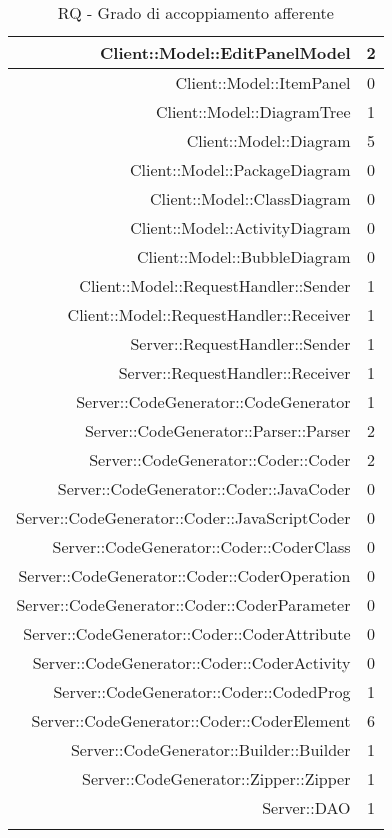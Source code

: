 \documentclass[../PianoDiQualifica.tex]{subfiles}
\begin{document}
\begin{longtable}{|r|c|}
						Client::Model::EditPanelModel & 2 \\ \hline
						Client::Model::ItemPanel & 0 \\ \hline
						Client::Model::DiagramTree & 1 \\ \hline
						Client::Model::Diagram & 5 \\ \hline
						Client::Model::PackageDiagram & 0 \\ \hline
						Client::Model::ClassDiagram & 0 \\ \hline
						Client::Model::ActivityDiagram & 0 \\ \hline
						Client::Model::BubbleDiagram & 0 \\ \hline
						Client::Model::RequestHandler::Sender & 1 \\ \hline
						Client::Model::RequestHandler::Receiver & 1 \\ \hline
						Server::RequestHandler::Sender & 1 \\ \hline
						Server::RequestHandler::Receiver & 1 \\ \hline
						Server::CodeGenerator::CodeGenerator & 1 \\ \hline
						Server::CodeGenerator::Parser::Parser & 2 \\ \hline
						Server::CodeGenerator::Coder::Coder & 2 \\ \hline
						Server::CodeGenerator::Coder::JavaCoder & 0 \\ \hline
						Server::CodeGenerator::Coder::JavaScriptCoder & 0 \\ \hline
						Server::CodeGenerator::Coder::CoderClass & 0 \\ \hline
						Server::CodeGenerator::Coder::CoderOperation & 0 \\ \hline
						Server::CodeGenerator::Coder::CoderParameter & 0 \\ \hline
						Server::CodeGenerator::Coder::CoderAttribute & 0 \\ \hline
						Server::CodeGenerator::Coder::CoderActivity & 0 \\ \hline
						Server::CodeGenerator::Coder::CodedProg & 1 \\ \hline
						Server::CodeGenerator::Coder::CoderElement & 6 \\ \hline
						Server::CodeGenerator::Builder::Builder & 1 \\ \hline
						Server::CodeGenerator::Zipper::Zipper & 1 \\ \hline
						Server::DAO & 1 \\ \hline
					\caption{RQ - Grado di accoppiamento afferente}
					\end{longtable}
\end{document}

